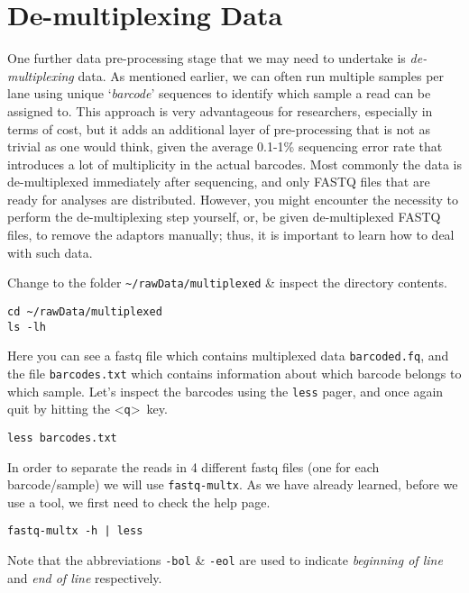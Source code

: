\section{De-multiplexing Data}

\begin{note}
One further data pre-processing stage that we may need to undertake is \textit{de-multiplexing} data.
As mentioned earlier, we can often run multiple samples per lane using unique `\textit{barcode}' sequences to identify which sample a read can be assigned to.
This approach is very advantageous for researchers, especially in terms of cost, but it adds an additional layer of pre-processing that is not as trivial as one would think, given the average 0.1-1\% sequencing error rate that introduces a lot of multiplicity in the actual barcodes. 
Most commonly the data is de-multiplexed immediately after sequencing, and only FASTQ files that are ready for analyses are distributed. 
However, you might encounter the necessity to perform the de-multiplexing step yourself, or, be given de-multiplexed FASTQ files, to remove the adaptors manually; thus, it is important to learn how to deal with such data. \\
\end{note}

\begin{steps}
Change to the folder \texttt{\~{}/rawData/multiplexed} \& inspect the directory contents.
\begin{lstlisting}
cd ~/rawData/multiplexed
ls -lh
\end{lstlisting}
Here you can see a fastq file which contains multiplexed data \texttt{barcoded.fq}, and the file \texttt{barcodes.txt} which contains information about which barcode belongs to which sample.
Let's inspect the barcodes using the \texttt{less} pager, and once again quit by hitting the \textless \texttt{q}\textgreater ~key.
\begin{lstlisting}
less barcodes.txt
\end{lstlisting}
\end{steps}

\begin{steps}
In order to separate the reads in 4 different fastq files (one for each barcode/sample) we will use \texttt{fastq-multx}. 
As we have already learned, before we use a tool, we first need to check the help page.
\begin{lstlisting}
fastq-multx -h | less
\end{lstlisting}
Note that the abbreviations \texttt{-bol} \& \texttt{-eol} are used to indicate \textit{beginning of line} and \textit{end of line} respectively.
\end{steps}


